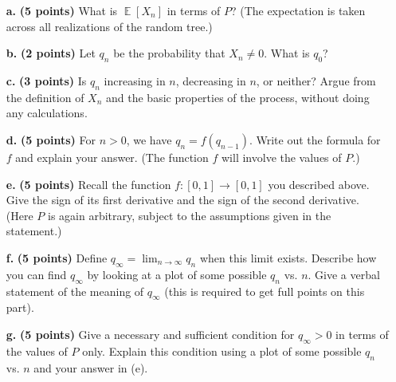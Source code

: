\documentclass[11pt]{article}
\DeclareMathOperator*{\E}{\mathbb{E}}
\begin{document}
\begin{itemize}

        \item[\textbf{a.}]  \textbf{(5 points)} What is $\E[X_n]$ in terms of $P$? (The expectation is taken across all realizations of the random tree.)
        \item[\textbf{b.}]  \textbf{(2 points)}  Let ${q}_n$ be the probability that $X_n \neq 0$. What is ${q}_0$?
        \item[\textbf{c.}]  \textbf{(3 points)} Is ${q}_n$ increasing in $n$, decreasing in $n$, or neither? Argue from the definition of $X_n$ and the basic properties of the process, without doing any calculations.
        \item[\textbf{d.}]  \textbf{(5 points)} For $n >0$, we have ${q}_n = f({q}_{n-1})$. Write out the formula for $f$ and explain your answer. (The function $f$ will involve the values of $P$.)

        \item[\textbf{e.}]  \textbf{(5 points)} Recall the function $f:[0,1] \to [0,1]$ you described above. Give the sign of its first derivative and the sign of the second derivative. (Here $P$ is again arbitrary, subject to the assumptions given in the statement.)

        \item[\textbf{f.}]  \textbf{(5 points)} Define ${q}_\infty=\lim_{n \to \infty} q_n$ when this limit exists. Describe how you can find $q_\infty$ by looking at a plot of some possible $q_n$ vs. $n$. Give a verbal statement of the meaning of $q_\infty$ (this is required to get full points on this part).

        \item[\textbf{g.}]  \textbf{(5 points)} Give a necessary and sufficient condition for $q_\infty >0$ in terms of the values of $P$ only. Explain this condition using a plot of some possible $q_n$ vs. $n$ and your answer in (e).


        \end{itemize}
\end{document}

